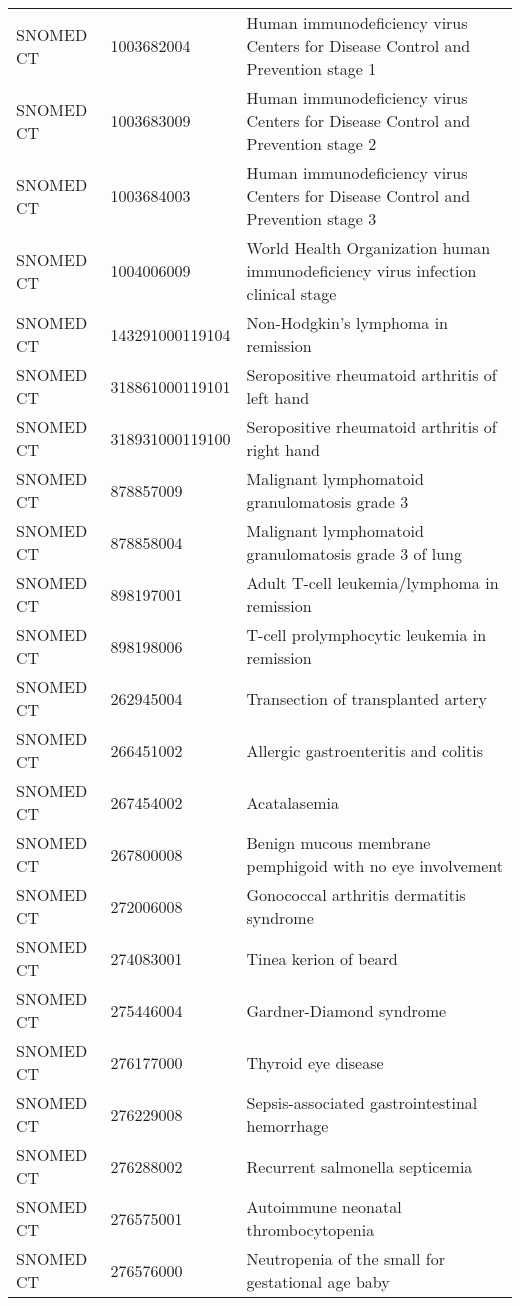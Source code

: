 \begin{longtable}{p{}p{}p{}}
  SNOMED CT & 1003682004 & Human immunodeficiency virus Centers for Disease Control and Prevention stage 1 \\ 
  SNOMED CT & 1003683009 & Human immunodeficiency virus Centers for Disease Control and Prevention stage 2 \\ 
  SNOMED CT & 1003684003 & Human immunodeficiency virus Centers for Disease Control and Prevention stage 3 \\ 
  SNOMED CT & 1004006009 & World Health Organization human immunodeficiency virus infection clinical stage \\ 
  SNOMED CT & 143291000119104 & Non-Hodgkin's lymphoma in remission \\ 
  SNOMED CT & 318861000119101 & Seropositive rheumatoid arthritis of left hand \\ 
  SNOMED CT & 318931000119100 & Seropositive rheumatoid arthritis of right hand \\ 
  SNOMED CT & 878857009 & Malignant lymphomatoid granulomatosis grade 3 \\ 
  SNOMED CT & 878858004 & Malignant lymphomatoid granulomatosis grade 3 of lung \\ 
  SNOMED CT & 898197001 & Adult T-cell leukemia/lymphoma in remission \\ 
  SNOMED CT & 898198006 & T-cell prolymphocytic leukemia in remission \\ 
  SNOMED CT & 262945004 & Transection of transplanted artery \\ 
  SNOMED CT & 266451002 & Allergic gastroenteritis and colitis \\ 
  SNOMED CT & 267454002 & Acatalasemia \\ 
  SNOMED CT & 267800008 & Benign mucous membrane pemphigoid with no eye involvement \\ 
  SNOMED CT & 272006008 & Gonococcal arthritis dermatitis syndrome \\ 
  SNOMED CT & 274083001 & Tinea kerion of beard \\ 
  SNOMED CT & 275446004 & Gardner-Diamond syndrome \\ 
  SNOMED CT & 276177000 & Thyroid eye disease \\ 
  SNOMED CT & 276229008 & Sepsis-associated gastrointestinal hemorrhage \\ 
  SNOMED CT & 276288002 & Recurrent salmonella septicemia \\ 
  SNOMED CT & 276575001 & Autoimmune neonatal thrombocytopenia \\ 
  SNOMED CT & 276576000 & Neutropenia of the small for gestational age baby \\ 

\end{longtable}
